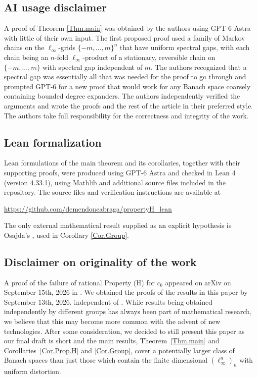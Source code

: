 \documentclass[11pt]{amsart}
\theoremstyle{definition}
\theoremstyle{remark}
\begin{document}
\subsection{AI usage disclaimer}
A proof of Theorem \ref{Thm.main} was obtained by the authors using GPT-6 Astra with little of their own input. The first proposed proof used a family of Markov chains on the $\ell_\infty$-grids $\{-m,\dots, m\}^n$ that have uniform spectral gaps, with each chain being an $n$-fold $\ell_\infty$-product of a stationary, reversible chain on $\{-m,\dots, m\}$ with spectral gap independent of $m$. The authors recognized that a spectral gap was essentially all that was needed for the proof to go through and prompted GPT-6 for a new proof that would work for any Banach space coarsely containing bounded degree expanders. The authors independently verified the arguments and wrote the proofs and the rest of the article in their preferred style. The authors take full responsibility for the correctness and integrity of the work. 


\subsection{Lean formalization}
Lean formulations of the main theorem and its corollaries,
together with their supporting proofs, were produced using
GPT-6 Astra and checked in Lean 4 (version 4.33.1), using
Mathlib and additional source files included in the repository.
The source files and verification instructions are available at
\begin{center}
\url{https://github.com/demendoncabraga/propertyH_lean}
\end{center}
\noindent
The only external mathematical result supplied as an explicit
hypothesis is Osajda's \cite[Theorem 4]{Osajda2020Acta}, used
in Corollary \ref{Cor.Group}.


\subsection{Disclaimer on originality of the work} \label{disclaimer}
A proof of the failure of rational Property (H) for $c_0$ appeared on arXiv on September 15th, 2026 in \cite{ChengChengWang}. We obtained the proofs of the results in this paper by September 13th, 2026, independent of \cite{ChengChengWang}. While results being obtained independently by different groups has always been part of mathematical research, we believe that this may become more common with the advent of new technologies. After some consideration, we decided to still present this paper as our final draft is short and the main results, Theorem~\ref{Thm.main} and Corollaries~\ref{Cor.Prop.H} and \ref{Cor.Group}, cover a potentially larger class of Banach spaces than just those which contain the finite dimensional $(\ell_\infty^n)_n$ with uniform distortion.
 
\end{document}
